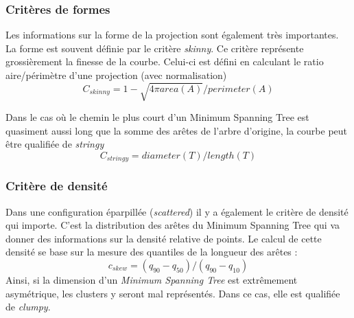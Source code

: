 \subsubsection{Critères de formes}

Les informations sur la forme de la projection sont également très importantes.\cite{wilkinson2005graph-MST}
La forme est souvent définie par le critère \textit{skinny}. Ce critère représente grossièrement la
finesse de la courbe. Celui-ci est défini en calculant le ratio aire/périmètre d’une projection
(avec normalisation) \[ C_{skinny} = 1 - \sqrt{4\pi area(A)}/perimeter(A) \]

Dans le cas où le chemin le plus court d’un Minimum Spanning Tree est quasiment aussi
long que la somme des arêtes de l’arbre d’origine, la courbe peut être qualifiée de \textit{stringy} \[C_{stringy} = diameter(T)/length(T) \]

\subsubsection{Critère de densité}
Dans une configuration éparpillée (\textit{scattered}) il y a également le critère de densité qui
importe. C’est la distribution des arêtes du Minimum Spanning Tree qui va donner des
informations sur la densité relative de points.
Le calcul de cette densité se base sur la mesure des quantiles de la longueur des arêtes : 
\[c_{skew} = (q_{90}-q_{50})/(q_{90}-q_{10})\]
Ainsi, si la dimension d’un \textit{Minimum Spanning Tree} est extrêmement asymétrique, les
clusters y seront mal représentés. Dans ce cas, elle est qualifiée de \textit{clumpy}. \cite{wilkinson2005graph-MST}


